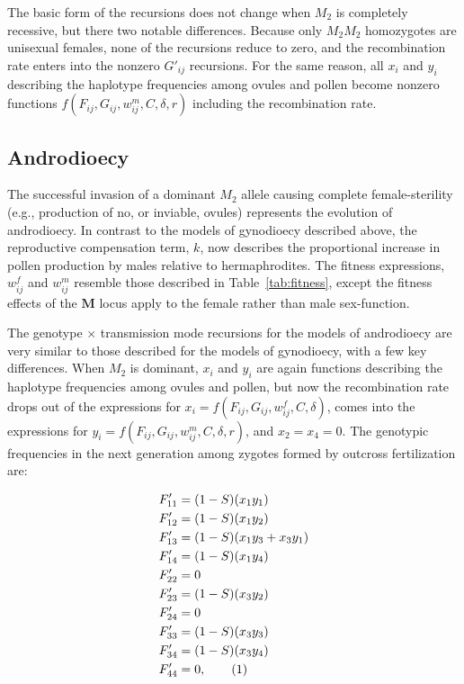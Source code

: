 \documentclass[9pt,twocolumn,twoside,lineno]{gsajnl}
\newcommand\numberthis{\addtocounter{equation}{1}\tag{\theequation}}
\begin{document}
The basic form of the recursions does not change when $M_2$ is completely recessive, but there two notable differences. Because only $M_2M_2$ homozygotes are unisexual females, none of the recursions reduce to zero, and the recombination rate enters into the nonzero $G'_{ij}$ recursions. For the same reason, all $x_i$ and $y_i$ describing the haplotype frequencies among ovules and pollen become nonzero functions $f(F_{ij},G_{ij},w^m_{ij},C,\delta,r)$ including the recombination rate.


\subsection{Androdioecy}

The successful invasion of a dominant $M_2$ allele causing complete female-sterility (e.g., production of no, or inviable, ovules) represents the evolution of androdioecy. In contrast to the models of gynodioecy described above, the reproductive compensation term, $k$, now describes the proportional increase in pollen production by males relative to hermaphrodites. The fitness expressions, $w^f_{ij}$ and $w^m_{ij}$ resemble those described in Table~\ref{tab:fitness}, except the fitness effects of the $\mathbf{M}$ locus apply to the female rather than male sex-function. 

The genotype $\times$ transmission mode recursions for the models of androdioecy are very similar to those described for the models of gynodioecy, with a few key differences. When $M_2$ is dominant, $x_{i}$ and $y_{i}$ are again functions describing the haplotype frequencies among ovules and pollen, but now the recombination rate drops out of the expressions for $x_i=f(F_{ij},G_{ij},w^f_{ij},C,\delta)$, comes into the expressions for $y_i=f(F_{ij},G_{ij},w^m_{ij},C,\delta,r)$, and $x_2=x_4=0$. The genotypic frequencies in the next generation among zygotes formed by outcross fertilization are:
\begin{linenomath}\begin{align*} \label{eq:FprAnd}
    F'_{11} &= (1 - S) (x_1 y_1) \\
    F'_{12} &= (1 - S) (x_1 y_2) \\
    F'_{13} &= (1 - S) (x_1 y_3 + x_3 y_1) \\
    F'_{14} &= (1 - S) (x_1 y_4) \\
    F'_{22} &= 0 \\
    F'_{23} &= (1 - S) (x_3 y_2) \\
    F'_{24} &= 0 \\
    F'_{33} &= (1 - S) (x_3 y_3) \\
    F'_{34} &= (1 - S) (x_3 y_4) \\
    F'_{44} &= 0, \numberthis
\end{align*} \end{linenomath}
\end{document}
